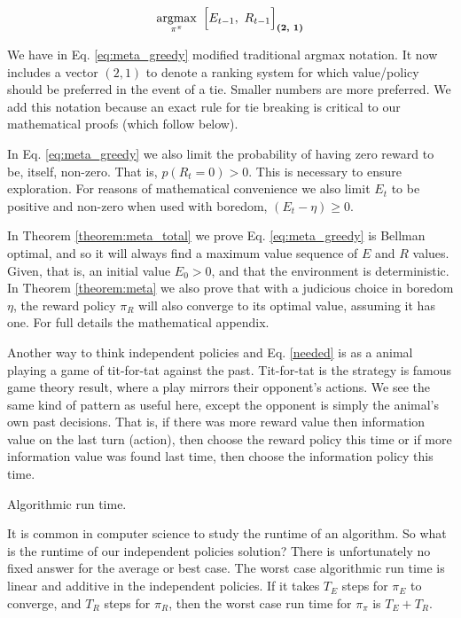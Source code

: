\begin{equation}
\label{eq:meta_greedy} 
	\operatorname*{argmax}_{\pi^{\pi}} \ \Big [ E_{t-1},\ R_{t-1} \Big ]_{\textbf{(2, 1)}}
\end{equation}
	
We have in Eq. \ref{eq:meta_greedy} modified traditional argmax notation. It now includes a vector $(2,1)$ to denote a ranking system for which value/policy should be preferred in the event of a tie. Smaller numbers are more preferred. We add this notation because an exact rule for tie breaking is critical to our mathematical proofs (which follow below). 

In Eq. \ref{eq:meta_greedy} we also limit the probability of having zero reward to be, itself, non-zero. That is, $p(R_t=0) > 0$. This is necessary to ensure exploration. For reasons of mathematical convenience we also limit $E_t$ to be positive and non-zero when used with boredom, $(E_t - \eta) \geq 0$. 

In Theorem \ref{theorem:meta_total} we prove Eq. \ref{eq:meta_greedy} is Bellman optimal, and so it will always find a maximum value sequence of $E$ and $R$ values. Given, that is, an initial value $E_0 > 0$, and that the environment is deterministic. In Theorem \ref{theorem:meta} we also prove that with a judicious choice in boredom $\eta$, the reward policy $\pi_R$ will also converge to its optimal value, assuming it has one. For full details the mathematical appendix.

Another way to think independent policies and Eq. \ref{needed} is as a animal playing a game of tit-for-tat against the past. Tit-for-tat is the strategy is famous game theory result, where a play mirrors their opponent’s actions. We see the same kind of pattern as useful here, except the opponent is simply the animal’s own past decisions. That is, if there was more reward value then information value on the last turn (action), then choose the reward policy this time or if more information value was found last time, then choose the information policy this time.

\begin{featurebox}
	\caption{Algorithmic run time.}
	\label{box:complexity}
	It is common in computer science to study the runtime of an algorithm. So what is the runtime of our independent policies solution? There is unfortunately no fixed answer for the average or best case. The worst case algorithmic run time is linear and additive in the independent policies. If it takes $T_E$ steps for $\pi_E$ to converge, and $T_R$ steps for $\pi_R$, then the worst case run time for $\pi_{\pi}$ is $T_E + T_R$. 
	\medskip
\end{featurebox}

